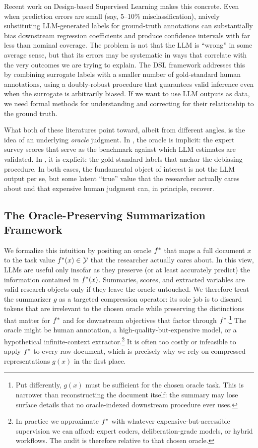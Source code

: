 Recent work on Design-based Supervised Learning \citep{EgamiEtAl2024} makes this concrete. Even when prediction errors are small (say, 5--10\% misclassification), naively substituting LLM-generated labels for ground-truth annotations can substantially bias downstream regression coefficients and produce confidence intervals with far less than nominal coverage. The problem is not that the LLM is ``wrong'' in some average sense, but that its errors may be systematic in ways that correlate with the very outcomes we are trying to explain. The DSL framework addresses this by combining surrogate labels with a smaller number of gold-standard human annotations, using a doubly-robust procedure that guarantees valid inference even when the surrogate is arbitrarily biased. If we want to use LLM outputs as data, we need formal methods for understanding and correcting for their relationship to the ground truth.

What both of these literatures point toward, albeit from different angles, is the idea of an underlying \emph{oracle} judgment. In \citet{BenoitEtAl2025}, the oracle is implicit: the expert survey scores that serve as the benchmark against which LLM estimates are validated. In \citet{EgamiEtAl2024}, it is explicit: the gold-standard labels that anchor the debiasing procedure. In both cases, the fundamental object of interest is not the LLM output per se, but some latent ``true'' value that the researcher actually cares about and that expensive human judgment can, in principle, recover.

\subsection{The Oracle-Preserving Summarization Framework}

We formalize this intuition by positing an oracle $f^{\ast}$ that maps a full document $x$ to the task value $f^{\ast}(x) \in \mathcal{Y}$ that the researcher actually cares about. In this view, LLMs are useful only insofar as they preserve (or at least accurately predict) the information contained in $f^{\ast}(x)$. Summaries, scores, and extracted variables are valid research objects only if they leave the oracle untouched. We therefore treat the summarizer $g$ as a targeted compression operator: its sole job is to discard tokens that are irrelevant to the chosen oracle while preserving the distinctions that matter for $f^{\ast}$ and for downstream objectives that factor through $f^{\ast}$.\footnote{Put differently, $g(x)$ must be sufficient for the chosen oracle task. This is narrower than reconstructing the document itself: the summary may lose surface details that no oracle-indexed downstream procedure ever uses.} The oracle might be human annotation, a high-quality-but-expensive model, or a hypothetical infinite-context extractor.\footnote{In practice we approximate $f^{\ast}$ with whatever expensive-but-accessible supervision we can afford: expert coders, deliberation-grade models, or hybrid workflows. The audit is therefore relative to that chosen oracle.} It is often too costly or infeasible to apply $f^{\ast}$ to every raw document, which is precisely why we rely on compressed representations $g(x)$ in the first place.

